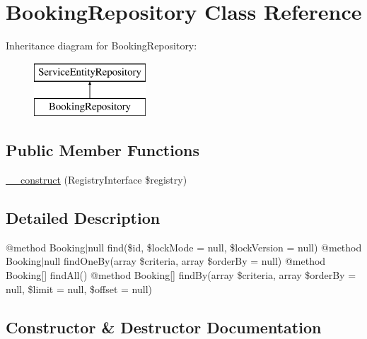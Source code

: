 \hypertarget{class_app_1_1_repository_1_1_booking_repository}{}\section{Booking\+Repository Class Reference}
\label{class_app_1_1_repository_1_1_booking_repository}
Inheritance diagram for Booking\+Repository\+:\begin{figure}[H]
\begin{center}
\leavevmode
\includegraphics[height=2.000000cm]{class_app_1_1_repository_1_1_booking_repository}
\end{center}
\end{figure}
\subsection*{Public Member Functions}
\begin{DoxyCompactItemize}
\item 
\mbox{\hyperlink{class_app_1_1_repository_1_1_booking_repository_aadca7edd263e228921a1860bb6b9c252}{\+\_\+\+\_\+construct}} (Registry\+Interface \$registry)
\end{DoxyCompactItemize}


\subsection{Detailed Description}
@method Booking$\vert$null find(\$id, \$lock\+Mode = null, \$lock\+Version = null) @method Booking$\vert$null find\+One\+By(array \$criteria, array \$order\+By = null) @method Booking\mbox{[}\mbox{]} find\+All() @method Booking\mbox{[}\mbox{]} find\+By(array \$criteria, array \$order\+By = null, \$limit = null, \$offset = null) 

\subsection{Constructor \& Destructor Documentation}
\mbox{\label{class_app_1_1_repository_1_1_booking_repository_aadca7edd263e228921a1860bb6b9c252}} 
